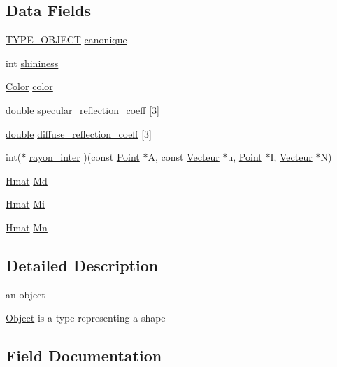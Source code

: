 \subsection*{Data Fields}
\begin{DoxyCompactItemize}
\item 
\hyperlink{_object_8h_af3ec464aa442c2d0bd0c227fda28a8be}{T\+Y\+P\+E\+\_\+\+O\+B\+J\+E\+CT} \hyperlink{struct_object_a19f6ed1bac9f5cab449a607abca42685}{canonique}
\item 
int \hyperlink{struct_object_ac8b96df3945daad611d0e916baf3fd33}{shininess}
\item 
\hyperlink{struct_color}{Color} \hyperlink{struct_object_aa5f4d1eda21c196bd8401ff73f105073}{color}
\item 
\hyperlink{g3x__transfo_8h_a89b2b23e407882a535d835574a7912e1}{double} \hyperlink{struct_object_a7b9fa288e1cec876534bd6f5b17aa049}{specular\+\_\+reflection\+\_\+coeff} \mbox{[}3\mbox{]}
\item 
\hyperlink{g3x__transfo_8h_a89b2b23e407882a535d835574a7912e1}{double} \hyperlink{struct_object_a365382686d7b8904ca564cd7745a7dbe}{diffuse\+\_\+reflection\+\_\+coeff} \mbox{[}3\mbox{]}
\item 
int($\ast$ \hyperlink{struct_object_a3f68899f8db0dc480e823d27163e1639}{rayon\+\_\+inter} )(const \hyperlink{struct_point}{Point} $\ast$A, const \hyperlink{struct_vecteur}{Vecteur} $\ast$u, \hyperlink{struct_point}{Point} $\ast$I, \hyperlink{struct_vecteur}{Vecteur} $\ast$N)
\item 
\hyperlink{_hmat_8h_a7263a9d077d77f58425e01446b766c9f}{Hmat} \hyperlink{struct_object_a2e39a1b3b70d4fad8a907b217ef63f59}{Md}
\item 
\hyperlink{_hmat_8h_a7263a9d077d77f58425e01446b766c9f}{Hmat} \hyperlink{struct_object_ab0efdf841b049d1b6f42f1c6c28a9557}{Mi}
\item 
\hyperlink{_hmat_8h_a7263a9d077d77f58425e01446b766c9f}{Hmat} \hyperlink{struct_object_a377e7ee9e852999ea0e10c66d74ddfb4}{Mn}
\end{DoxyCompactItemize}


\subsection{Detailed Description}
an object 

\hyperlink{struct_object}{Object} is a type representing a shape 

\subsection{Field Documentation}
\mbox{\label{struct_object_a19f6ed1bac9f5cab449a607abca42685}} 
